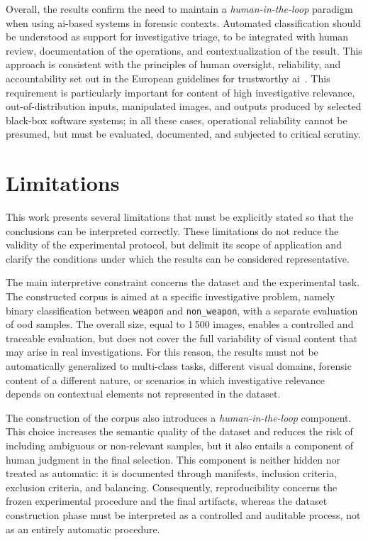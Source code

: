 Overall, the results confirm the need to maintain a
\textit{human-in-the-loop} paradigm when using \gls{ai}-based systems in
forensic contexts. Automated classification should be understood as support for
investigative triage, to be integrated with human review, documentation of the
operations, and contextualization of the result. This approach is consistent
with the principles of human oversight, reliability, and accountability set out
in the European guidelines for trustworthy \gls{ai}~\cite{EUAI2020}. This
requirement is particularly important for content of high investigative
relevance, out-of-distribution inputs, manipulated images, and outputs produced
by selected black-box software systems; in all these cases, operational
reliability cannot be presumed, but must be evaluated, documented, and subjected
to critical scrutiny.

\section{Limitations}
\label{sec:conclusions-limitations}

This work presents several limitations that must be explicitly stated so that
the conclusions can be interpreted correctly. These limitations do not reduce
the validity of the experimental protocol, but delimit its scope of application
and clarify the conditions under which the results can be considered
representative.

The main interpretive constraint concerns the dataset and the experimental
task. The constructed corpus is aimed at a specific investigative problem,
namely binary classification between \texttt{weapon} and \texttt{non\_weapon},
with a separate evaluation of \gls{ood} samples. The overall size, equal to
1\,500 images, enables a controlled and traceable evaluation, but does not cover
the full variability of visual content that may arise in real investigations.
For this reason, the results must not be automatically generalized to
multi-class tasks, different visual domains, forensic content of a different
nature, or scenarios in which investigative relevance depends on contextual
elements not represented in the dataset.

The construction of the corpus also introduces a
\textit{human-in-the-loop} component. This choice increases the semantic quality
of the dataset and reduces the risk of including ambiguous or non-relevant
samples, but it also entails a component of human judgment in the final
selection. This component is neither hidden nor treated as automatic: it is
documented through manifests, inclusion criteria, exclusion criteria, and
balancing. Consequently, reproducibility concerns the frozen experimental
procedure and the final artifacts, whereas the dataset construction phase must
be interpreted as a controlled and auditable process, not as an entirely
automatic procedure.

